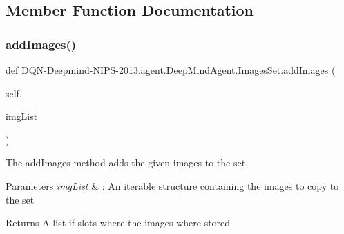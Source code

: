 \subsection{Member Function Documentation}
\hypertarget{classDQN-Deepmind-NIPS-2013_1_1agent_1_1DeepMindAgent_1_1ImagesSet_a27898f9b6851b1e27e34be9842859c7f}{}\label{classDQN-Deepmind-NIPS-2013_1_1agent_1_1DeepMindAgent_1_1ImagesSet_a27898f9b6851b1e27e34be9842859c7f} 
\subsubsection{\texorpdfstring{add\+Images()}{addImages()}}
{\footnotesize\ttfamily def D\+QN-\/Deepmind-\/N\+I\+PS-\/2013.agent.\+Deep\+Mind\+Agent.\+Images\+Set.\+add\+Images (\begin{DoxyParamCaption}\item[{}]{self,  }\item[{}]{img\+List }\end{DoxyParamCaption})}



The add\+Images method adds the given images to the set. 


\begin{DoxyParams}{Parameters}
{\em img\+List} & \+: An iterable structure containing the images to copy to the set\\
\hline
\end{DoxyParams}
\begin{DoxyReturn}{Returns}
A list if slots where the images where stored 
\end{DoxyReturn}
\hypertarget{classDQN-Deepmind-NIPS-2013_1_1agent_1_1DeepMindAgent_1_1ImagesSet_a5f0032044a746fce8cdcccedc8059b57}{}\label{classDQN-Deepmind-NIPS-2013_1_1agent_1_1DeepMindAgent_1_1ImagesSet_a5f0032044a746fce8cdcccedc8059b57} 
